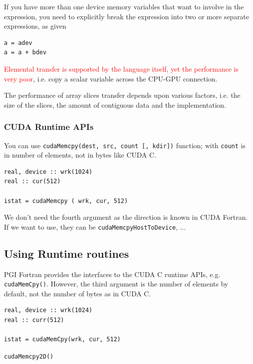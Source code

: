 If you have more than one device memory variables that want to involve
in the expression, you need to explicitly break the expression into
two or more separate expressions, as given
\begin{lstlisting}
a = adev
a = a + bdev
\end{lstlisting}

\begin{framed}  
  \textcolor{red}{Elemental transfer is supported by the language
    itself, yet the performance is very poor}, i.e. copy a scalar
  variable across the CPU-GPU connection.
  
  The performance of array slices transfer depends upon various
  factors, i.e.  the size of the slices, the amount of contiguous data
  and the implementation.
\end{framed}



\subsubsection{CUDA Runtime APIs}
\label{sec:cuda-runtime-apis}

You can use \verb!cudaMemcpy(dest, src, count [, kdir])! function;
with \verb!count! is in number of elements, not in bytes like CUDA C.
\begin{lstlisting}
real, device :: wrk(1024)
real :: cur(512)

istat = cudaMemcpy ( wrk, cur, 512)
\end{lstlisting}
We don't need the fourth argument as the direction is known in CUDA
Fortran. If we want to use, they can be \verb!cudaMemcpyHostToDevice!,
...

\subsection{Using Runtime routines}
\label{sec:runtime-routines}

PGI Fortran provides the interfaces to the CUDA C runtime APIs,
e.g. \verb!cudaMemCpy()!. However, the third argument is the number of
elements by default, not the number of bytes as in CUDA C.
\begin{lstlisting}
real, device :: wrk(1024)
real :: curr(512)

istat = cudaMemCpy(wrk, cur, 512)
\end{lstlisting}

\verb!cudaMemcpy2D()! 


